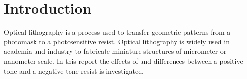 \section*{Introduction}
Optical lithography is a process used to transfer geometric patterns from a photomask to a photosensitive resist. Optical lithography is widely used in academia and industry to fabricate miniature structures of micrometer or nanometer scale. In this report the effects of and differences between a positive tone and a negative tone resist is investigated.